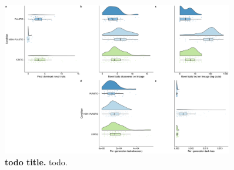 \begin{figure}[h!]
    \centering
    \includegraphics[width=0.9\textwidth]{media/complex-traits-panel.pdf}
    \caption{\small
    \textbf{todo title.}
    todo.
    }
    \label{fig:complex-traits}
\end{figure}